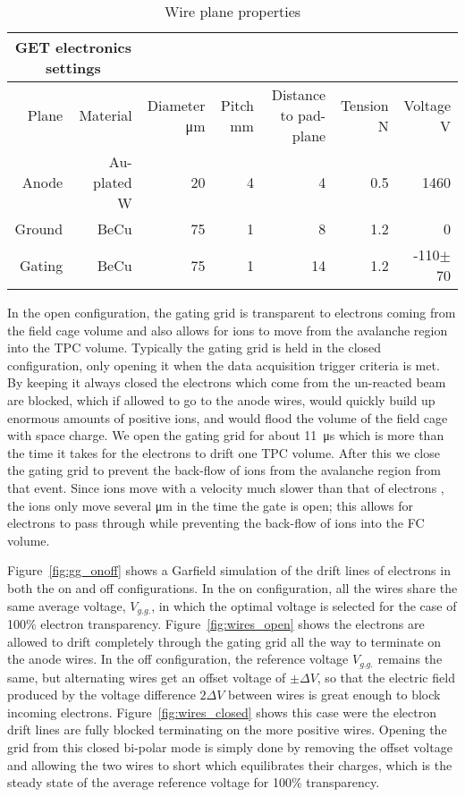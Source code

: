  \begin{table*}[!htb]
 \centering
{}
\begin{tabular}{@{}rrrrrrr@{}}\toprule 
\multicolumn{2}{c}{GET electronics settings}\\
\midrule
 Plane & Material & Diameter \si{\micro\metre} & Pitch \si{\milli\metre} & Distance to pad-plane & Tension \si{\newton} & Voltage \si{\volt}\\ [0.5ex] 
 Anode  & Au-plated W   &  20  &  4  &  4   &  0.5  &  1460  \\
 Ground & BeCu          &  75  &  1  &  8   &  1.2  &  0     \\ 
 Gating & BeCu          &  75  &  1  &  14   &  1.2 &  -110$\pm$ 70\\ 
 \bottomrule
\end{tabular}
\caption{Wire plane properties}
\label{tb:wireplane}
\end{table*}

In the open configuration, the gating grid is transparent to electrons coming from the field cage volume and also allows for ions to move from the avalanche region into the TPC volume. Typically the gating grid is held in the closed configuration, only opening it when the data acquisition trigger criteria is met. By keeping it always closed the electrons which come from the un-reacted beam are blocked,  which if allowed to go to the anode wires, would quickly build up enormous amounts of positive ions, and would flood the volume of the field cage with space charge. We open the gating grid for about \SI{11}{\micro\second} which is more than the time it takes for the electrons to drift one TPC volume. After this we close the gating grid to prevent the back-flow of ions from the avalanche region from that event. Since ions move with a velocity much slower than that of electrons \cite{blumrol}, the ions only move several \si{\micro\metre} in the time the gate is open; this allows for electrons to pass through while preventing the back-flow of ions into the FC volume. 

Figure~\ref{fig:gg_onoff} shows a Garfield simulation of the drift lines of electrons in both the on and off configurations. In the on configuration, all the wires share the same average voltage, $V_{g.g.}$, in which the optimal voltage is selected for the case of 100\% electron transparency. Figure~\ref{fig:wires_open} shows the electrons are allowed to drift completely through the gating grid all the way to terminate on the anode wires. In the off configuration, the reference voltage $V_{g.g.}$ remains the same, but alternating wires get an offset voltage of $\pm \Delta V$, so that the electric field produced by the voltage difference $2\Delta V$ between wires is great enough to block incoming electrons. Figure~\ref{fig:wires_closed} shows this case were the electron drift lines are fully blocked terminating on the more positive wires. Opening the grid from this closed bi-polar mode is simply done by removing the offset voltage and allowing the two wires to short which equilibrates their charges, which is the steady state of the average reference voltage for 100\% transparency.


